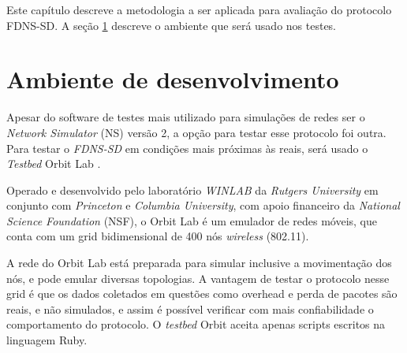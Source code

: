 
Este capítulo descreve a metodologia a ser aplicada para avaliação do protocolo
FDNS-SD. A seção \ref{ambiente} descreve o ambiente que será usado nos testes.

\section{Ambiente de desenvolvimento}
\label{ambiente}

    Apesar do software de testes mais utilizado para simulações de redes ser o
    \textit{Network Simulator} (NS) versão 2, a opção para testar esse protocolo
    foi outra. Para testar o \textit{FDNS-SD} em condições mais próximas às reais,
    será usado o \textit{Testbed} Orbit Lab \cite{orbit}.
    
    Operado e desenvolvido pelo laboratório \textit{WINLAB} \cite{winlab} da
    \textit{Rutgers University} em conjunto com \textit{Princeton} e
    \textit{Columbia University}, com apoio financeiro da \textit{National
    Science Foundation} (NSF), o Orbit Lab é um emulador de redes móveis, que
    conta com um grid bidimensional de 400 nós \textit{wireless} (802.11).

    A rede do Orbit Lab está preparada para simular inclusive a movimentação dos nós,
    e pode emular diversas topologias. A vantagem de testar o protocolo nesse grid é
    que os dados coletados em questões como overhead e perda de pacotes são reais, e
    não simulados, e assim é possível verificar com mais confiabilidade o comportamento
    do protocolo. O \textit{testbed} Orbit aceita apenas scripts escritos na linguagem
    Ruby.